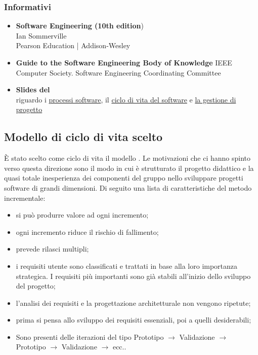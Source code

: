 		\subsubsection{Informativi}
			\begin{itemize}
				\item \textbf{Software Engineering (10th edition}) \\
				Ian Sommerville \\
				Pearson Education | Addison-Wesley
				\item \textbf{Guide to the Software Engineering Body of Knowledge}
				IEEE Computer Society. Software Engineering Coordinating Committee
				\item \textbf{Slides del \COMMITTENTE} \\ riguardo i  \href{http://www.math.unipd.it/~tullio/IS-1/2015/Dispense/L02.pdf}{processi software}, il \href{http://www.math.unipd.it/~tullio/IS-1/2015/Dispense/L03.pdf}{ciclo di vita del software} e \href{http://www.math.unipd.it/~tullio/IS-1/2015/Dispense/L04.pdf}{la gestione di progetto}	
			\end{itemize}
	\subsection{Modello di ciclo di vita scelto}
	È stato scelto come ciclo di vita il modello . Le motivazioni che ci hanno spinto verso questa direzione sono il modo in cui è strutturato il progetto didattico e la quasi totale inesperienza dei componenti del gruppo nello sviluppare progetti software di grandi dimensioni. Di seguito una lista di caratteristiche del metodo incrementale:
	\begin{itemize}
		\item si può produrre valore ad ogni incremento;
		\item ogni incremento riduce il rischio di fallimento;
		\item prevede rilasci multipli;
		\item i requisiti utente sono classificati e trattati in base alla loro importanza strategica. I requisiti più importanti sono già stabili all'inizio dello sviluppo del progetto;
		\item l'analisi dei requisiti e la progettazione architetturale non vengono ripetute;
		\item prima si pensa allo sviluppo dei requisiti essenziali, poi a quelli desiderabili;
		\item Sono presenti delle iterazioni del tipo Prototipo $\rightarrow$ Validazione $\rightarrow$ Prototipo $\rightarrow$ Validazione $\rightarrow$ ecc..
	\end{itemize}
